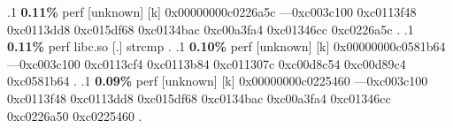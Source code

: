 \begin{profile}
{.1 \textbf{ 0.11\%} perf             [unknown]              [k] 0x00000000c0226a5c\newline {} ---0xc003c100\newline {} 0xc0113f48\newline {} 0xc0113dd8\newline {} 0xc015df68\newline {} 0xc0134bac\newline {} 0xc00a3fa4\newline {} 0xc01346cc\newline {} 0xc0226a5c\newline {} . 
.1 \textbf{ 0.11\%} perf             libc.so                [.] strcmp\newline {} . 
.1 \textbf{ 0.10\%} perf             [unknown]              [k] 0x00000000c0581b64\newline {} ---0xc003c100\newline {} 0xc0113cf4\newline {} 0xc0113b84\newline {} 0xc011307c\newline {} 0xc00d8c54\newline {} 0xc00d89c4\newline {} 0xc0581b64\newline {} . 
.1 \textbf{ 0.09\%} perf             [unknown]              [k] 0x00000000c0225460\newline {} ---0xc003c100\newline {} 0xc0113f48\newline {} 0xc0113dd8\newline {} 0xc015df68\newline {} 0xc0134bac\newline {} 0xc00a3fa4\newline {} 0xc01346cc\newline {} 0xc0226a50\newline {} 0xc0225460\newline {} . 
}
\end{profile}
